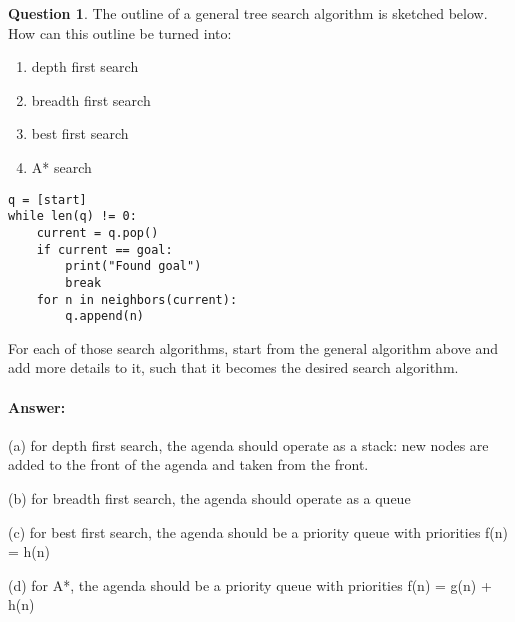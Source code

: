 \documentclass[11pt,a4paper]{article}
\theoremstyle{definition}%
\newtheorem{Q}{Question}[] %
\newcommand{\reponse}[1]{%
\ifthenelse {\boolean{corrige}} {\paragraph{Answer:} \color{darkblue}   #1\color{black}} {}
}
\begin{document}
\begin{Q}
The outline of a general tree search algorithm is sketched below. How can this outline be
turned into:
\begin{enumerate}
    \item depth first search
    \item breadth first search
    \item best first search
    \item A* search
\end{enumerate}

\begin{verbatim}
q = [start]
while len(q) != 0:
    current = q.pop()
    if current == goal:
        print("Found goal")
        break
    for n in neighbors(current):
        q.append(n)
\end{verbatim}

For each of those search algorithms, start from the general algorithm above and add more
details to it, such that it becomes the desired search algorithm.
\reponse{
(a) for depth first search, the agenda should operate as a stack: new nodes are added to
the front of the agenda and taken from the front.

(b) for breadth first search, the agenda should operate as a queue

(c) for best first search, the agenda should be a priority queue with priorities f(n) = h(n)

(d) for A*, the agenda should be a priority queue with priorities f(n) = g(n) + h(n)
}
\end{Q}
\end{document}
